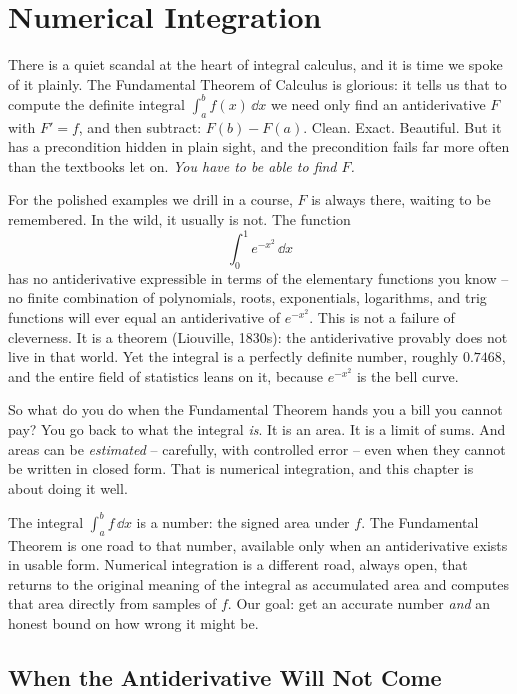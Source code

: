 \chapter{Numerical Integration}

There is a quiet scandal at the heart of integral calculus, and it is time we spoke of it plainly. The Fundamental Theorem of Calculus is glorious: it tells us that to compute the definite integral $\int_a^b f(x)\,\dd x$ we need only find an antiderivative $F$ with $F' = f$, and then subtract: $F(b) - F(a)$. Clean. Exact. Beautiful. But it has a precondition hidden in plain sight, and the precondition fails far more often than the textbooks let on. \emph{You have to be able to find $F$.}

For the polished examples we drill in a course, $F$ is always there, waiting to be remembered. In the wild, it usually is not. The function
\[
\int_0^1 e^{-x^2}\,\dd x
\]
has no antiderivative expressible in terms of the elementary functions you know -- no finite combination of polynomials, roots, exponentials, logarithms, and trig functions will ever equal an antiderivative of $e^{-x^2}$. This is not a failure of cleverness. It is a theorem (Liouville, 1830s): the antiderivative provably does not live in that world. Yet the integral is a perfectly definite number, roughly $0.7468$, and the entire field of statistics leans on it, because $e^{-x^2}$ is the bell curve.

So what do you do when the Fundamental Theorem hands you a bill you cannot pay? You go back to what the integral \emph{is}. It is an area. It is a limit of sums. And areas can be \emph{estimated} -- carefully, with controlled error -- even when they cannot be written in closed form. That is numerical integration, and this chapter is about doing it well.

\begin{focusbox}
The integral $\int_a^b f\,\dd x$ is a number: the signed area under $f$. The Fundamental Theorem is one road to that number, available only when an antiderivative exists in usable form. Numerical integration is a different road, always open, that returns to the original meaning of the integral as accumulated area and computes that area directly from samples of $f$. Our goal: get an accurate number \emph{and} an honest bound on how wrong it might be.
\end{focusbox}

\section{When the Antiderivative Will Not Come}
\label{ch27:noanti}

